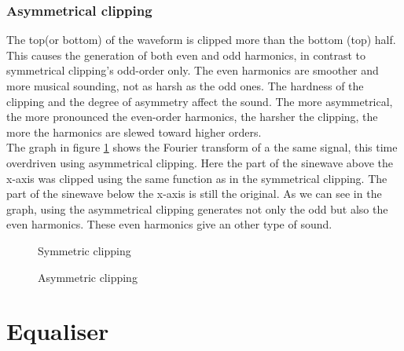 \subsubsection{Asymmetrical clipping}
The top(or bottom) of the waveform is clipped more than the bottom (top) half. This causes the generation of both even and odd harmonics, in contrast to symmetrical clipping's odd-order only. The even harmonics are smoother and more musical sounding, not as harsh as the odd ones. The hardness of the clipping and the degree of asymmetry affect the sound. The more asymmetrical, the more pronounced the even-order harmonics, the harsher the clipping, the more the harmonics are slewed toward higher orders. \\
The graph in figure \ref{fig:over5} shows the Fourier transform of a the same signal, this time overdriven using asymmetrical clipping. Here the part of the sinewave above the x-axis was clipped using the same function as in the symmetrical clipping. The part of the sinewave below the x-axis is still the original. As we can see in the graph, using the asymmetrical clipping generates not only the odd but also the even harmonics. These even harmonics give an other type of sound.
\begin{figure}[ht]
  \hfill
  \begin{minipage}[t]{.45\textwidth}
    \begin{center}  
      \caption{Symmetric clipping}
      \label{fig:over4}
    \end{center}
  \end{minipage}
  \hfill
  \begin{minipage}[t]{.45\textwidth}
    \begin{center}  
      \caption{Asymmetric clipping}
      \label{fig:over5}
    \end{center}
  \end{minipage}
  \hfill
\end{figure}
\section{Equaliser}

